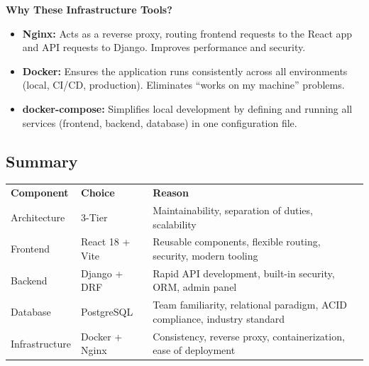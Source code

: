 \documentclass[12pt, a4paper]{article}
\begin{document}
\textbf{Why These Infrastructure Tools?}

\begin{itemize}
  \item \textbf{Nginx:} Acts as a reverse proxy, routing frontend requests to the React app and API requests to Django. Improves performance and security.
  \item \textbf{Docker:} Ensures the application runs consistently across all environments (local, CI/CD, production). Eliminates ``works on my machine'' problems.
  \item \textbf{docker-compose:} Simplifies local development by defining and running all services (frontend, backend, database) in one configuration file.
\end{itemize}

\subsection*{Summary}

\begin{tabular}{L{2.6cm} L{3.4cm} L{7.4cm}}
  \color{white}\bfseries Component &
  \color{white}\bfseries Choice &
  \color{white}\bfseries Reason \\
  Architecture & 3-Tier & Maintainability, separation of duties, scalability \\
  Frontend & React 18 + Vite & Reusable components, flexible routing, security, modern tooling \\
  Backend & Django + DRF & Rapid API development, built-in security, ORM, admin panel \\
  Database & PostgreSQL & Team familiarity, relational paradigm, ACID compliance, industry standard \\
  Infrastructure & Docker + Nginx & Consistency, reverse proxy, containerization, ease of deployment \\
\end{tabular}
\end{document}
